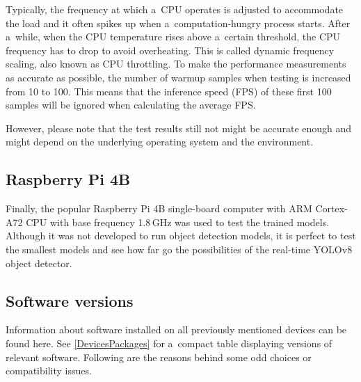Typically, the frequency at which a~CPU operates is adjusted to accommodate the
load and it often spikes up when a~computation-hungry process starts. After
a~while, when the CPU temperature rises above a~certain threshold, the CPU
frequency has to drop to avoid overheating. This is called dynamic frequency
scaling, also known as CPU throttling. To make the performance measurements as
accurate as possible, the number of warmup samples when testing is increased
from 10 to 100. This means that the inference speed (FPS) of these first 100
samples will be ignored when calculating the average FPS.

However, please note that the test results still not might be accurate enough
and might depend on the underlying operating system and the environment.


\subsection{Raspberry Pi 4B}

Finally, the popular Raspberry Pi 4B single-board computer with ARM Cortex-A72
CPU with base frequency 1.8\,GHz was used to test the trained models. Although it
was not developed to run object detection models, it is perfect to test the
smallest models and see how far go the possibilities of the real-time YOLOv8
object detector.


\subsection{Software versions}

Information about software installed on all previously mentioned devices can be
found here. See \autoref{DevicesPackages} for a~compact table displaying
versions of relevant software. Following are the reasons behind some odd choices
or compatibility issues.

